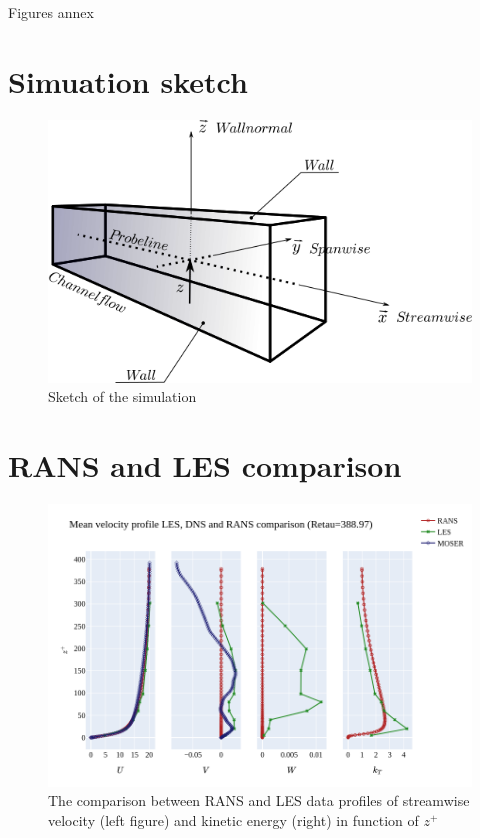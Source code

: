 \documentclass[]{article}
\theoremstyle{plain}
\theoremstyle{remark}
\begin{document}
\begin{center} 
	\huge Figures annex
\end{center}

\section{Simuation sketch}

\begin{figure}[h]
	\begin{center}
		\includegraphics[width=\textwidth]{../../report/referance/channel_flow.png}
		\caption{Sketch of the simulation}
	\end{center}
\end{figure}

\section{RANS and LES comparison}

\begin{figure}[h]
	\begin{center}
	\includegraphics[width=\textwidth]{../../output/figures/channel_wrles_retau395/split_time/RANS/RANS_LES_MOSER_profiles_all.png}
	\caption{The comparison between RANS and LES data profiles of streamwise velocity (left figure) and kinetic energy (right) in function of $z^+$}
	\end{center}
\end{figure}
\end{document}
